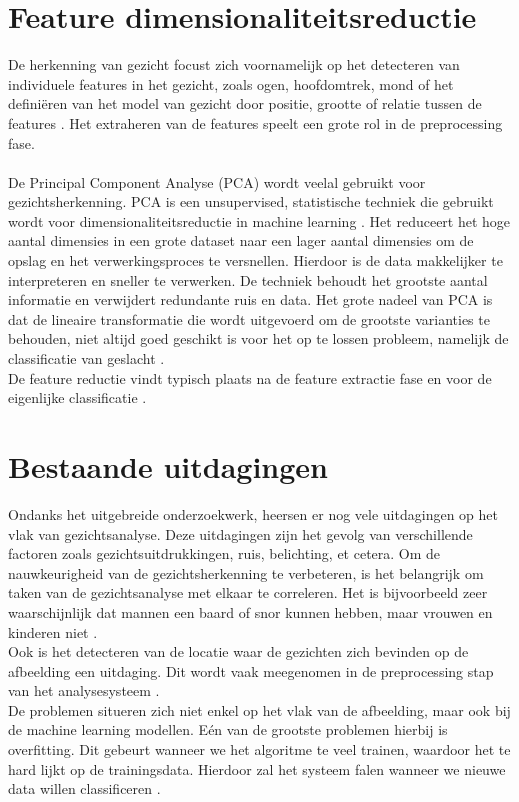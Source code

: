 \section{Feature dimensionaliteitsreductie} \label{sec:featuredimred}
De herkenning van gezicht focust zich voornamelijk op het detecteren van individuele features in het gezicht, zoals ogen, hoofdomtrek, mond of het definiëren van het model van gezicht door positie, grootte of relatie tussen de features \autocite{Lin2006}. Het extraheren van de features speelt een grote rol in de preprocessing fase. \\
\\
De Principal Component Analyse (PCA) wordt veelal gebruikt voor gezichtsherkenning. PCA is een unsupervised, statistische techniek die gebruikt wordt voor dimensionaliteitsreductie in machine learning \autocite{SalihHasan2021}. Het reduceert het hoge aantal dimensies in een grote dataset naar een lager aantal dimensies om de opslag en het verwerkingsproces te versnellen. Hierdoor is de data makkelijker te interpreteren en sneller te verwerken. De techniek behoudt het grootste aantal informatie en verwijdert redundante ruis en data. Het grote nadeel van PCA is dat de lineaire transformatie die wordt uitgevoerd om de grootste varianties te behouden, niet altijd goed geschikt is voor het op te lossen probleem, namelijk de classificatie van geslacht \autocite{Wang2010}. \\
De feature reductie vindt typisch plaats na de feature extractie fase en voor de eigenlijke classificatie \autocite{Lakshmiprabha2016}.

\section{Bestaande uitdagingen} \label{sec:uitdagingen}
Ondanks het uitgebreide onderzoekwerk, heersen er nog vele uitdagingen op het vlak van gezichtsanalyse. Deze uitdagingen zijn het gevolg van verschillende factoren zoals gezichtsuitdrukkingen, ruis, belichting, et cetera. Om de nauwkeurigheid van de gezichtsherkenning te verbeteren, is het belangrijk om taken van de gezichtsanalyse met elkaar te correleren. Het is bijvoorbeeld zeer waarschijnlijk dat mannen een baard of snor kunnen hebben, maar vrouwen en kinderen niet \autocite{Siddiqi2022}. 
\\
Ook is het detecteren van de locatie waar de gezichten zich bevinden op de afbeelding een uitdaging. Dit wordt vaak meegenomen in de preprocessing stap van het analysesysteem \autocite{Jiang2008}.
\\
De problemen situeren zich niet enkel op het vlak van de afbeelding, maar ook bij de machine learning modellen. Eén van de grootste problemen hierbij is overfitting. Dit gebeurt wanneer we het algoritme te veel trainen, waardoor het te hard lijkt op de trainingsdata. Hierdoor zal het systeem falen wanneer we nieuwe data willen classificeren \autocite{Coppens2018}.

